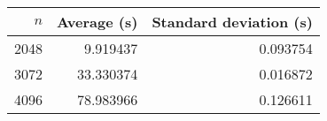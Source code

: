 \begin{tabular}{rrr}
$n$ & Average (s) & Standard deviation (s)\\\hline
2048 & 9.919437 & 0.093754\\
3072 & 33.330374 & 0.016872\\
4096 & 78.983966 & 0.126611\\
\end{tabular}
